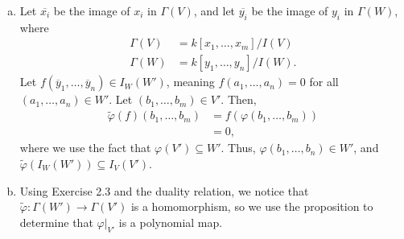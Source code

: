 \documentclass[10pt]{mypackage}
\begin{document}
\begin{solution}\hfill
  \begin{enumerate}[(a)]
    \item Let $ \overline{x_i} $ be the image of $x_i$ in $\Gamma(V)$, and let $ \overline{y_i} $ be the image of $y_i$ in $\Gamma(W)$, where
      \begin{align*}
        \Gamma(V) &= k\left[ x_1,\dots,x_m \right]/I(V)\\
        \Gamma(W) &= k\left[ y_1,\dots,y_n \right]/I(W).
      \end{align*}
      Let $f\left( \overline{y}_1,\dots, \overline{y}_n \right)\in I_W\left( W' \right)$, meaning $f\left( a_1,\dots,a_n \right)= 0$ for all $\left( a_1,\dots,a_n \right)\in W'$. Let $\left( b_1,\dots,b_m \right)\in V'$. Then,
      \begin{align*}
        \widetilde{\varphi}\left( f \right)\left( b_1,\dots,b_m \right) &= f\left( \varphi\left( b_1,\dots,b_m \right) \right)\\
                                                                        &= 0,
      \end{align*}
      where we use the fact that $\varphi\left( V' \right)\subseteq W'$. Thus, $\varphi\left( b_1,\dots,b_n \right)\in W'$, and $\widetilde{\varphi}\left( I_W\left( W' \right) \right)\subseteq I_V\left( V' \right)$.
    \item Using Exercise 2.3 and the duality relation, we notice that $\widetilde{\varphi}\colon \Gamma\left( W' \right)\rightarrow \Gamma\left( V' \right)$ is a homomorphism, so we use the proposition to determine that $\varphi|_{V'}$ is a polynomial map.
  \end{enumerate}
\end{solution}
\end{document}
